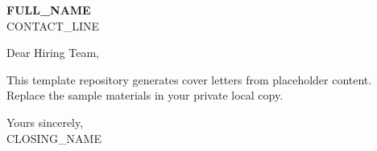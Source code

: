 \documentclass[a4paper,11pt]{letter}
\begin{document}
\begin{letter}{}

\begin{center}
    {\Large \textbf{{{FULL_NAME}}}}\\[2pt]
    {{CONTACT_LINE}}
\end{center}

\vspace{-0.1cm}

\opening{Dear Hiring Team,}

This template repository generates cover letters from placeholder content. Replace the sample materials in your private local copy.

\closing{Yours sincerely,\\[2pt] {{CLOSING_NAME}}}

\end{letter}
\end{document}
